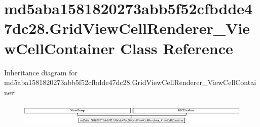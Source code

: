 \hypertarget{classmd5aba1581820273abb5f52cfbdde47dc28_1_1GridViewCellRenderer__ViewCellContainer}{}\section{md5aba1581820273abb5f52cfbdde47dc28.\+Grid\+View\+Cell\+Renderer\+\_\+\+View\+Cell\+Container Class Reference}
\label{classmd5aba1581820273abb5f52cfbdde47dc28_1_1GridViewCellRenderer__ViewCellContainer}
Inheritance diagram for md5aba1581820273abb5f52cfbdde47dc28.\+Grid\+View\+Cell\+Renderer\+\_\+\+View\+Cell\+Container\+:\begin{figure}[H]
\begin{center}
\leavevmode
\includegraphics[height=1.111111cm]{classmd5aba1581820273abb5f52cfbdde47dc28_1_1GridViewCellRenderer__ViewCellContainer}
\end{center}
\end{figure}
